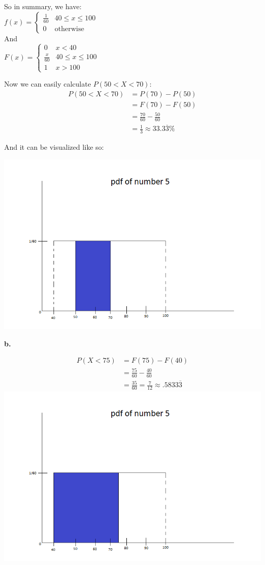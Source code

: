 \documentclass[12pt]{report}
\newcommand{\twopartdef}[4]
{
	\left\{
	\begin{array}{ll}
		#1 & \mbox{} #2 \\
		#3 & \mbox{} #4
	\end{array}
	\right.
}
\newcommand{\threepartdef}[6]
{
	\left\{
	\begin{array}{lll}
		#1 & \mbox{} #2 \\
		#3 & \mbox{} #4 \\
		#5 & \mbox{} #6
	\end{array}
	\right.
}
\begin{document}
\noindent So in summary, we have:\\

\centering
$f(x) = \twopartdef{\frac{1}{60}}{40 \leq x \leq 100}{0}{\text{otherwise}}$\\
\bigskip
\noindent And\\
\bigskip
$F(x) = \threepartdef{0}{x < 40}{\frac{x}{60}}{40 \leq x \leq 100}{1}{x > 100}$\\

\justify

\pagebreak
\noindent Now we can easily calculate $P(50 < X < 70)$:
\begin{align*}
P(50 < X < 70) &= P(70) - P(50)\\
&= F(70) - F(50)\\
&= \frac{70}{60} - \frac{50}{60}\\
&= \boxed{\frac{1}{3} \approx 33.3\overline{3}\%}
\end{align*}

\noindent And it can be visualized like so:

\includegraphics[scale = .7]{hw3_5a}

\pagebreak

\noindent \textbf{b.}

\begin{align*}
P(X < 75) &= F(75) - F(40)\\
&= \frac{75}{60} - \frac{40}{60}\\
&= \boxed{\frac{35}{60} = \frac{7}{12} \approx .5833\overline{3}}
\end{align*}
\includegraphics[scale = .7]{hw3_5b}\\
\pagebreak
\end{document}
